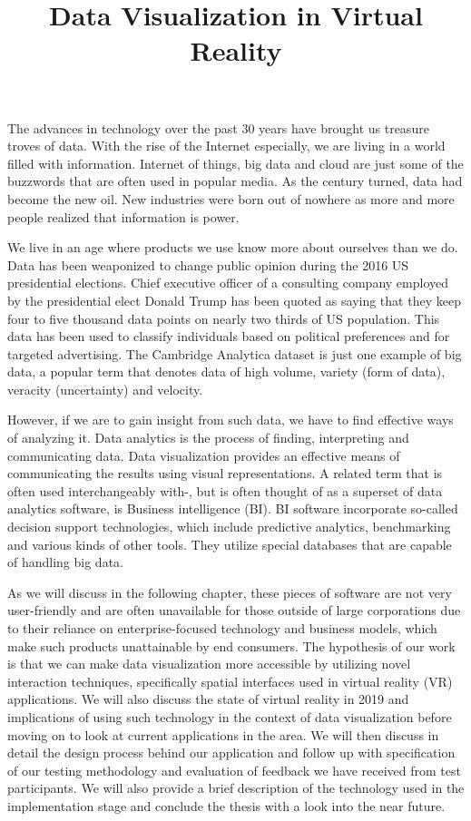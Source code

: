 \documentclass[thesis=M,english,hidelinks]{FITthesisXE}[2012/06/26]
\title{Data Visualization in Virtual Reality}
\begin{document}
\begin{introduction}

The advances in technology over the past 30 years have brought us treasure troves of data. With the rise of the Internet especially, we are living in a world filled with information. Internet of things, big data and cloud are just some of the buzzwords that are often used in popular media. As the century turned, data had become the new oil. New industries were born out of nowhere as more and more people realized that information is power.

We live in an age where products we use know more about ourselves than we do. Data has been weaponized to change public opinion during the 2016 US presidential elections. Chief executive officer of a consulting company employed by the presidential elect Donald Trump has been quoted as saying that they keep four to five thousand data points on nearly two thirds of US population.\autocite{cambridge} This data has been used to classify individuals based on political preferences and for targeted advertising. The Cambridge Analytica dataset is just one example of big data, a popular term that denotes data of high volume, variety (form of data), veracity (uncertainty) and velocity.\autocite{bigdata}

However, if we are to gain insight from such data, we have to find effective ways of analyzing it. Data analytics is the process of finding, interpreting and communicating data. Data visualization provides an effective means of communicating the results using visual representations. A related term that is often used interchangeably with-, but is often thought of as a superset of data analytics software, is Business intelligence (BI). BI software incorporate so-called decision support technologies, which include predictive analytics, benchmarking and various kinds of other tools. They utilize special databases that are capable of handling big data.\autocite{bi}

As we will discuss in the following chapter, these pieces of software are not very user-friendly and are often unavailable for those outside of large corporations due to their reliance on enterprise-focused technology and business models, which make such products unattainable by end consumers. The hypothesis of our work is that we can make data visualization more accessible by utilizing novel interaction techniques, specifically spatial interfaces used in virtual reality (VR) applications. We will also discuss the state of virtual reality in 2019 and implications of using such technology in the context of data visualization before moving on to look at current applications in the area. We will then discuss in detail the design process behind our application and follow up with specification of our testing methodology and evaluation of feedback we have received from test participants. We will also provide a brief description of the technology used in the implementation stage and conclude the thesis with a look into the near future.


\end{introduction}
\end{document}
